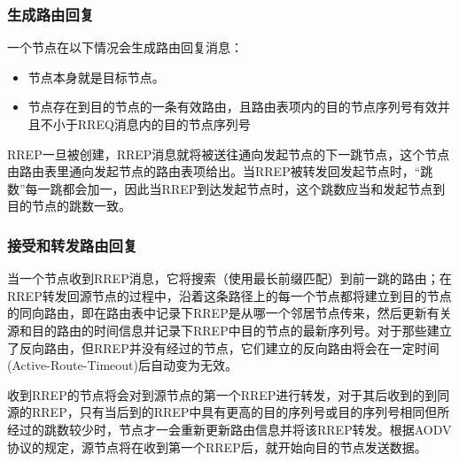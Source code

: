 \documentclass[12pt,a4paper]{article}
\begin{document}
\subsubsection{生成路由回复}
一个节点在以下情况会生成路由回复消息：
\begin{itemize}
\item 节点本身就是目标节点。
\item 节点存在到目的节点的一条有效路由，且路由表项内的目的节点序列号有效并且不小于RREQ消息内的目的节点序列号
\end{itemize}

RREP一旦被创建，RREP消息就将被送往通向发起节点的下一跳节点，这个节点由路由表里通向发起节点的路由表项给出。当RREP被转发回发起节点时，“跳数”每一跳都会加一，因此当RREP到达发起节点时，这个跳数应当和发起节点到目的节点的跳数一致。

\subsubsection{接受和转发路由回复}
当一个节点收到RREP消息，它将搜索（使用最长前缀匹配）到前一跳的路由；在RREP转发回源节点的过程中，沿着这条路径上的每一个节点都将建立到目的节点的同向路由，即在路由表中记录下RREP是从哪一个邻居节点传来，然后更新有关源和目的路由的时间信息并记录下RREP中目的节点的最新序列号。对于那些建立了反向路由，但RREP并没有经过的节点，它们建立的反向路由将会在一定时间(Active-Route-Timeout)后自动变为无效。

收到RREP的节点将会对到源节点的第一个RREP进行转发，对于其后收到的到同源的RREP，只有当后到的RREP中具有更高的目的序列号或目的序列号相同但所经过的跳数较少时，节点才一会重新更新路由信息并将该RREP转发。根据AODV协议的规定，源节点将在收到第一个RREP后，就开始向目的节点发送数据。




\end{document}
